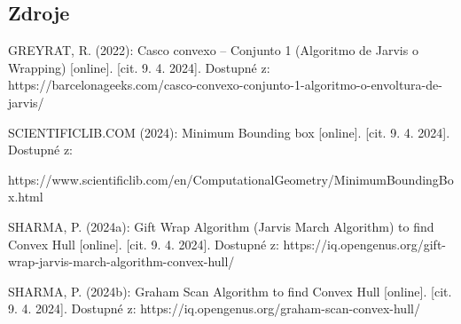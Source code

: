 \documentclass{article}
\begin{document}
\begin{spacing}{1.5}
\section{Zdroje}
\noindent GREYRAT, R. (2022): Casco convexo – Conjunto 1 (Algoritmo de Jarvis o Wrapping) [online]. [cit. 9. 4. 2024]. Dostupné z: https://barcelonageeks.com/casco-convexo-conjunto-1-algoritmo-o-envoltura-de-jarvis/ 

\vspace*{0.5cm}
\noindent SCIENTIFICLIB.COM (2024): Minimum Bounding box [online]. [cit. 9. 4. 2024]. Dostupné z:

\noindent https://www.scientificlib.com/en/ComputationalGeometry/MinimumBoundingBox.html 

\vspace*{0.5cm}
\noindent SHARMA, P. (2024a): Gift Wrap Algorithm (Jarvis March Algorithm) to find Convex Hull [online]. [cit. 9. 4. 2024]. Dostupné z: https://iq.opengenus.org/gift-wrap-jarvis-march-algorithm-convex-hull/ 

\vspace*{0.5cm}
\noindent SHARMA, P. (2024b): Graham Scan Algorithm to find Convex Hull [online]. [cit. 9. 4. 2024]. Dostupné z: https://iq.opengenus.org/graham-scan-convex-hull/ 


\end{spacing}
\end{document}
